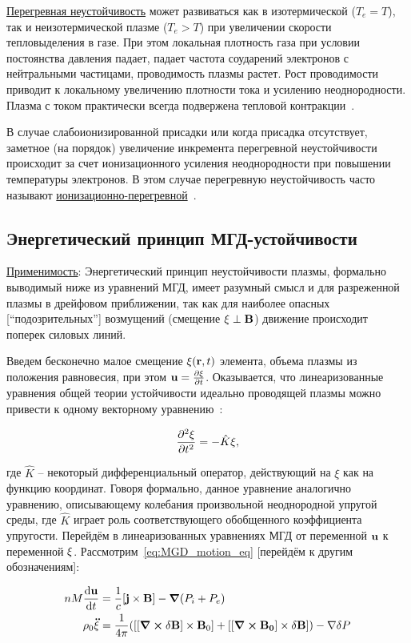 \documentclass[10pt, a4paper]{article}
\begin{document}
\uline{Перегревная неустойчивость} может развиваться как в изотермической ($T_e=T$), так и неизотермической плазме ($T_e>T$) при увеличении скорости тепловыделения в газе. При этом локальная плотность газа при условии постоянства давления падает, падает частота соударений электронов с нейтральными частицами, проводимость плазмы растет. Рост проводимости приводит к локальному увеличению плотности тока и усилению неоднородности. Плазма с током практически всегда подвержена тепловой контракции~\cite{golubev}.

В случае слабоионизированной присадки или когда присадка отсутствует, заметное (на порядок) увеличение инкремента перегревной
неустойчивости происходит за счет ионизационного усиления неоднородности при повышении температуры электронов. В этом случае
перегревную неустойчивость часто называют \uline{ионизационно-перегревной}~\cite{golubev}.
 
\subsection{Энергетический принцип МГД-устойчивости}

\uline{Применимость}: Энергетический принцип неустойчивости плазмы, формально выводимый ниже из уравнений МГД, имеет разумный
смысл и для разреженной плазмы в дрейфовом приближении, так
как для наиболее опасных [``подозрительных''] возмущений (смещение $\vb{\xi}\perp\vb{B}$) движение происходит поперек силовых линий.

Введем бесконечно малое смещение $\vb{\xi}(\vb{r}, t)$ элемента, объема плазмы из положения равновесия, при этом $\vb{u}=\pdv{\vb{\xi}}{t}$. Оказывается, что линеаризованные уравнения общей теории устойчивости идеально проводящей плазмы можно привести к одному векторному уравнению~\cite{arzimovich}:

\begin{equation*}
	\pdv[2]{\vb{\xi}}{t}=-\hat{K}\vb{\xi},
\end{equation*}

где $\hat{K}$ -- некоторый дифференциальный оператор, действующий на $\xi$ как на функцию координат. Говоря формально, данное уравнение аналогично уравнению, описывающему колебания произвольной неоднородной упругой среды, где $\hat{K}$ играет роль соответствующего обобщенного коэффициента упругости. Перейдём в линеаризованных уравнениях МГД от переменной $\vb{u}$ к переменной $\vb{\xi}$. Рассмотрим~\eqref{eq:MGD_motion_eq} [перейдём к другим обозначениям]:

\begin{align*}
	n M \dv{\vb{u}}{t} &= \frac{1}{c}[\vb{j}\times\vb{B}]-\grad{(P_i+P_e)} \\
	\rho_0 \vb{\ddot{\xi}} &= \frac{1}{4\pi}([[\curl{\delta\vb{B}}]\times\vb{B}_0] + [[\curl{\vb{B_0}}]\times\delta\vb{B}])-\nabla \delta P
\end{align*}
\end{document}

